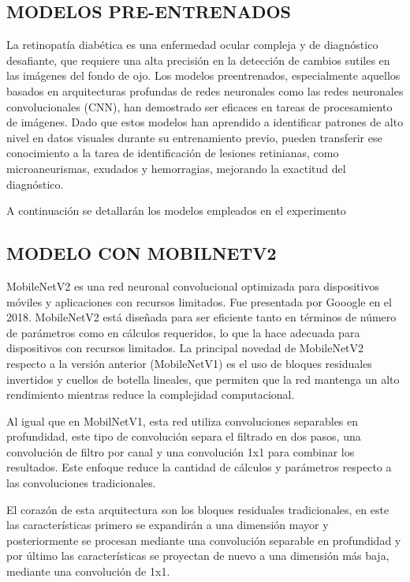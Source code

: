 \subsection{MODELOS PRE-ENTRENADOS} 

La retinopatía diabética es una enfermedad ocular compleja y de diagnóstico desafiante,
que requiere una alta precisión en la detección de cambios sutiles en las imágenes del
fondo de ojo. Los modelos preentrenados, especialmente aquellos basados en arquitecturas
profundas de redes neuronales como las redes neuronales convolucionales (CNN), han
demostrado ser eficaces en tareas de procesamiento de imágenes. Dado que estos modelos han
aprendido a identificar patrones de alto nivel en datos visuales durante su entrenamiento
previo, pueden transferir ese conocimiento a la tarea de identificación de lesiones
retinianas, como microaneurismas, exudados y hemorragias, mejorando la exactitud del
diagnóstico.

A continuación se detallarán los modelos empleados en el experimento

\subsection{MODELO CON MOBILNETV2}


MobileNetV2 es una red neuronal convolucional optimizada para dispositivos móviles y
aplicaciones con recursos limitados. Fue presentada por Gooogle en el 2018. MobileNetV2
está diseñada para ser eficiente tanto en términos de número de parámetros como en
cálculos requeridos, lo que la hace adecuada para dispositivos con recursos limitados. La
principal novedad de MobileNetV2 respecto a la versión anterior (MobileNetV1) es el uso de
bloques residuales invertidos y cuellos de botella lineales, que permiten que la red
mantenga un alto rendimiento mientras reduce la complejidad computacional.

Al igual que en MobilNetV1, esta red utiliza convoluciones separables en profundidad, este
tipo de convolución separa el filtrado en dos pasos, una convolución de filtro por canal y
una convolución 1x1 para combinar los resultados. Este enfoque reduce la cantidad de
cálculos y parámetros respecto a las convoluciones tradicionales.

El corazón de esta arquitectura son los bloques residuales tradicionales, en este las
características primero se expandirán a una dimensión mayor y posteriormente se procesan
mediante una convolución separable en profundidad y por último las características se
proyectan de nuevo a una dimensión más baja, mediante una convolución de 1x1.

